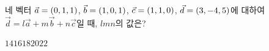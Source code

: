 네 벡터 $\vec{a}=(0{,}\mkern3mu\mathopen{}1{,}\mkern3mu\mathopen{}1)$, $\vec{b}=(1{,}\mkern3mu\mathopen{}0{,}\mkern3mu\mathopen{}1)$, $\vec{c}=(1{,}\mkern3mu\mathopen{}1{,}\mkern3mu\mathopen{}0)$, $\vec{d}=(3{,}\mkern3mu\mathopen{}-4{,}\mkern3mu\mathopen{}5)$에 대하여 $\vec{d}=l\vec{a}+m\vec{b}+n\vec{c}$일 때, $lmn$의 값은? 
\begin{choices32}{$14$}{$16$}{$18$}{$20$}{$22$}\end{choices32}
